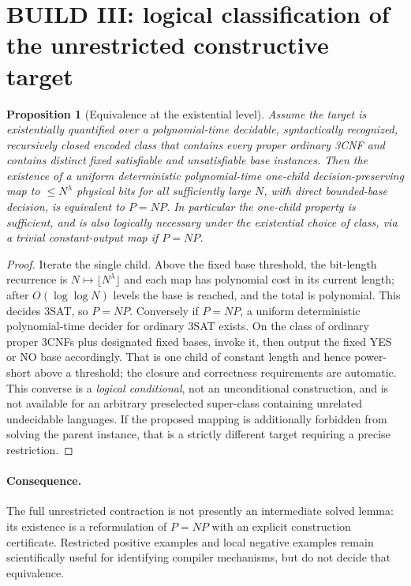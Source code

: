 \documentclass[11pt]{article}
\newtheorem{proposition}[theorem]{Proposition}
\begin{document}
\section{BUILD III: logical classification of the unrestricted constructive target}
\begin{proposition}[Equivalence at the existential level]
Assume the target is existentially quantified over a polynomial-time decidable, syntactically recognized, recursively closed encoded class that contains every proper ordinary 3CNF and contains distinct fixed satisfiable and unsatisfiable base instances. Then the existence of a \emph{uniform deterministic polynomial-time} one-child decision-preserving map to $\le N^\lambda$ physical bits for all sufficiently large $N$, with direct bounded-base decision, is \emph{equivalent} to $P=NP$. In particular the one-child property is sufficient, and is also logically necessary \emph{under the existential choice of class}, via a trivial constant-output map if $P=NP$.
\end{proposition}
\begin{proof}
Iterate the single child. Above the fixed base threshold, the bit-length recurrence is $N\mapsto\lfloor N^\lambda\rfloor$ and each map has polynomial cost in its current length; after $O(\log\log N)$ levels the base is reached, and the total is polynomial. This decides 3SAT, so $P=NP$. Conversely if $P=NP$, a uniform deterministic polynomial-time decider for ordinary 3SAT exists. On the class of ordinary proper 3CNFs plus designated fixed bases, invoke it, then output the fixed YES or NO base accordingly. That is one child of constant length and hence power-short above a threshold; the closure and correctness requirements are automatic. This converse is a \emph{logical conditional}, not an unconditional construction, and is not available for an arbitrary preselected super-class containing unrelated undecidable languages. If the proposed mapping is additionally forbidden from solving the parent instance, that is a strictly different target requiring a precise restriction.
\end{proof}
\paragraph{Consequence.} The full unrestricted contraction is not presently an intermediate solved lemma: its existence is a reformulation of $P=NP$ with an explicit construction certificate. Restricted positive examples and local negative examples remain scientifically useful for identifying compiler mechanisms, but do not decide that equivalence.
\end{document}
